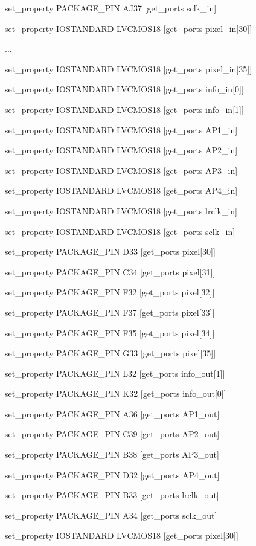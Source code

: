 set\_property PACKAGE\_PIN AJ37 [get\_ports sclk\_in]

set\_property IOSTANDARD LVCMOS18 [get\_ports {pixel\_in[30]}]

...

set\_property IOSTANDARD LVCMOS18 [get\_ports {pixel\_in[35]}]

set\_property IOSTANDARD LVCMOS18 [get\_ports {info\_in[0]}]

set\_property IOSTANDARD LVCMOS18 [get\_ports {info\_in[1]}]

set\_property IOSTANDARD LVCMOS18 [get\_ports AP1\_in]

set\_property IOSTANDARD LVCMOS18 [get\_ports AP2\_in]

set\_property IOSTANDARD LVCMOS18 [get\_ports AP3\_in]

set\_property IOSTANDARD LVCMOS18 [get\_ports AP4\_in]

set\_property IOSTANDARD LVCMOS18 [get\_ports lrclk\_in]

set\_property IOSTANDARD LVCMOS18 [get\_ports sclk\_in]


set\_property PACKAGE\_PIN D33 [get\_ports {pixel[30]}]

set\_property PACKAGE\_PIN C34 [get\_ports {pixel[31]}]

set\_property PACKAGE\_PIN F32 [get\_ports {pixel[32]}]

set\_property PACKAGE\_PIN F37 [get\_ports {pixel[33]}]

set\_property PACKAGE\_PIN F35 [get\_ports {pixel[34]}]

set\_property PACKAGE\_PIN G33 [get\_ports {pixel[35]}]

set\_property PACKAGE\_PIN L32 [get\_ports {info\_out[1]}] %

set\_property PACKAGE\_PIN K32 [get\_ports {info\_out[0]}] %

set\_property PACKAGE\_PIN A36 [get\_ports AP1\_out] %

set\_property PACKAGE\_PIN C39 [get\_ports AP2\_out] %

set\_property PACKAGE\_PIN B38 [get\_ports AP3\_out] %

set\_property PACKAGE\_PIN D32 [get\_ports AP4\_out] %

set\_property PACKAGE\_PIN B33 [get\_ports lrclk\_out] %

set\_property PACKAGE\_PIN A34 [get\_ports sclk\_out] %

set\_property IOSTANDARD LVCMOS18 [get\_ports {pixel[30]}]


